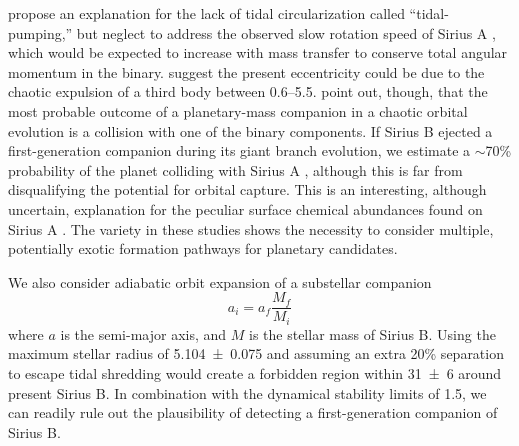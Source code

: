 \documentclass[twocolumn,linenumbers]{aastex631}
\begin{document}
\citet{bonacicmarinovicOrbitalEccentricitiesBinary2008} propose an explanation for the lack of tidal circularization called ``tidal-pumping,'' but neglect to address the observed slow rotation speed of Sirius A \citep{grayPreciseRotationRates2014,takedaRotationalVelocitySirius2020a}, which would be expected to increase with mass transfer to conserve total angular momentum in the binary. \citet{peretsTripleEvolutionDynamical2012} suggest the present eccentricity could be due to the chaotic expulsion of a third body between \qtyrange{0.6}{5.5}{\solarmass}. \citet{kratterStarHoppersPlanet2012} point out, though, that the most probable outcome of a planetary-mass companion in a chaotic orbital evolution is a collision with one of the binary components. If Sirius B ejected a first-generation companion during its giant branch evolution, we estimate a $\sim$70\% probability of the planet colliding with Sirius A \citep[Fig. 7]{kratterStarHoppersPlanet2012}, although this is far from disqualifying the potential for orbital capture. This is an interesting, although uncertain, explanation for the peculiar surface chemical abundances found on Sirius A \citep{landstreetAbundancesElementsHe2011a,takedaRotationalVelocitySirius2020a}. The variety in these studies shows the necessity to consider multiple, potentially exotic formation pathways for planetary candidates.

We also consider adiabatic orbit expansion of a substellar companion
\begin{equation}
a_i = a_f \frac{M_{f}}{M_{i}}
\end{equation}
where $a$ is the semi-major axis, and $M$ is the stellar mass of Sirius B. Using the maximum stellar radius of \qty{5.104\pm0.075}{\au} and assuming an extra 20\% separation to escape tidal shredding \citep{nordhausOrbitsLowmassCompanions2013} would create a forbidden region within \qty{31\pm6}{\au} around present Sirius B. In combination with the dynamical stability limits of \qty{1.5}{\au}, we can readily rule out the plausibility of detecting a first-generation companion of Sirius B.
\end{document}
